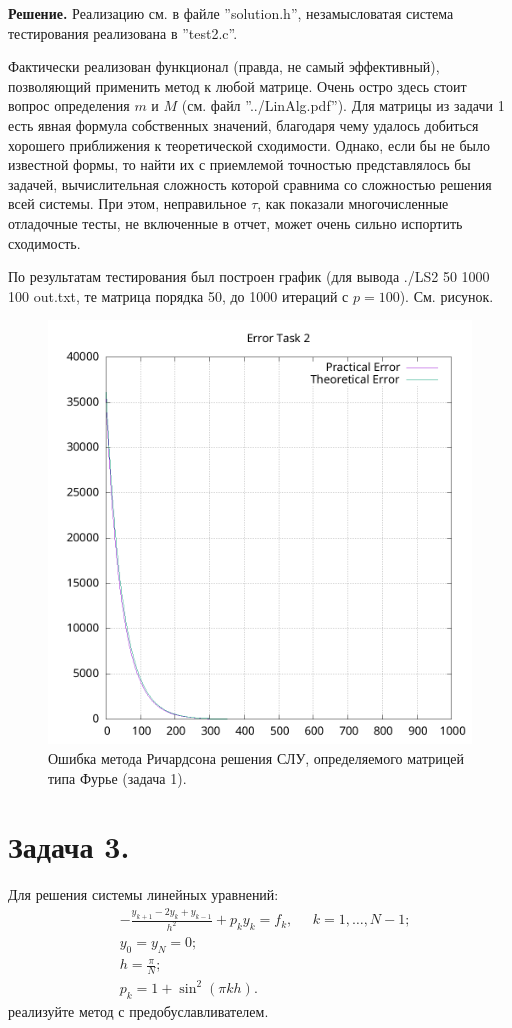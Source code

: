 \documentclass[14pt,a4paper]{extarticle}
\newcommand{\1}{\mathbbm{1}}
\begin{document}
\textbf{Решение.} 
Реализацию см. в файле ''solution.h'', незамысловатая система тестирования реализована в ''test2.c''. \par
Фактически реализован функционал (правда, не самый эффективный), позволяющий применить метод к любой матрице.
Очень остро здесь стоит вопрос определения $m$ и $M$ (см. файл ''../LinAlg.pdf''). Для матрицы из задачи 1 
есть явная формула собственных значений, благодаря чему удалось добиться хорошего приближения к теоретической сходимости. 
Однако, если бы не было известной формы, то найти их с приемлемой точностью представлялось бы задачей, вычислительная сложность которой
сравнима со сложностью решения всей системы. При этом, неправильное $\tau$, как показали многочисленные отладочные тесты,
не включенные в отчет, может очень сильно испортить сходимость. \par
По результатам тестирования был построен график (для вывода ./LS2 50 1000 100 out.txt, те матрица порядка 50, до 1000 итераций 
с $p = 100$). См. рисунок.

\begin{figure}
    \centering
    \includegraphics[scale=0.55]{Error2.png}
    \caption{Ошибка метода Ричардсона решения СЛУ, определяемого матрицей типа Фурье (задача 1).}
\end{figure}


\section{\textbf{Задача 3.}} Для решения системы линейных уравнений:
\begin{align*}
& -\frac{y_{k+1} - 2 y_k + y_{k-1}}{h^2} + p_k y_k = f_k, \;\;\;\;\; k = 1, \ldots, N - 1; \\
& y_0 = y_N = 0; \\
& h = \frac{\pi}{N}; \\
& p_k = 1 + \sin^2(\pi k h).
\end{align*}
реализуйте метод с предобуславливателем.
\end{document}
